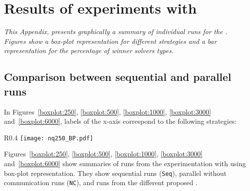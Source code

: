 \chapter{Results of experiments with \nqp}
\label{app:nqp}
\textit{This Appendix, presents graphically a summary of individual runs for the \nqp. Figures show a \textit{box-plot} representation for different strategies and a bar representation for the percentage of winner solvers types.}

\vspace{2ex}\vfill
\minitoc
\newpage

\section{Comparison between sequential and parallel runs}

In Figures~\ref{boxplot:250}, \ref{boxplot:500}, \ref{boxplot:1000}, \ref{boxplot:3000} and~\ref{boxplot:6000}, labels of the x-axis correspond to the following strategies:


\begin{wrapfigure}{R}{0.4\textwidth}
\centering
\texttt{[image: nq250\_BP.pdf]}
\caption{Different communication strategies to solve 250-Queens using \posl}\label{boxplot:250}
\end{wrapfigure}

Figures~\ref{boxplot:250}, \ref{boxplot:500}, \ref{boxplot:1000}, \ref{boxplot:3000} and~\ref{boxplot:6000} show summaries of runs from the experimentation with \nqp{} using box-plot representation. They show sequential runs (\texttt{Seq}), parallel without communication runs (\texttt{NC}), and runs from the different proposed \commstrs.

